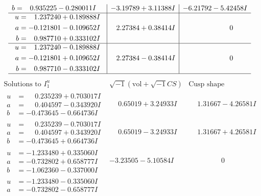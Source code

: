 \documentclass[1p]{elsarticle_modified}
\theoremstyle{definition}
\newcommand{\I}{\sqrt{-1}}
\begin{document}
$$\begin{array}{c|c|c}
\begin{aligned}
b &= \phantom{-}0.935225 - 0.280011 I\end{aligned}
 & -3.19789 + 3.11388 I & -6.21792 - 5.42458 I \\ \hline\begin{aligned}
u &= \phantom{-}1.237240 + 0.189888 I \\
a &= -0.121801 - 0.109652 I \\
b &= \phantom{-}0.987710 + 0.333102 I\end{aligned}
 & \phantom{-}2.27384 + 0.38414 I & \phantom{-0.000000 } 0 \\ \hline\begin{aligned}
u &= \phantom{-}1.237240 - 0.189888 I \\
a &= -0.121801 + 0.109652 I \\
b &= \phantom{-}0.987710 - 0.333102 I\end{aligned}
 & \phantom{-}2.27384 - 0.38414 I & \phantom{-0.000000 } 0\\
 \hline 
 \end{array}$$\newpage$$\begin{array}{c|c|c}  
\text{Solutions to }I^u_{1}& \I (\text{vol} + \sqrt{-1}CS) & \text{Cusp shape}\\
 \hline 
\begin{aligned}
u &= \phantom{-}0.235239 + 0.703017 I \\
a &= \phantom{-}0.404597 - 0.343920 I \\
b &= -0.473645 - 0.664736 I\end{aligned}
 & \phantom{-}0.65019 + 3.24933 I & \phantom{-}1.31667 - 4.26581 I \\ \hline\begin{aligned}
u &= \phantom{-}0.235239 - 0.703017 I \\
a &= \phantom{-}0.404597 + 0.343920 I \\
b &= -0.473645 + 0.664736 I\end{aligned}
 & \phantom{-}0.65019 - 3.24933 I & \phantom{-}1.31667 + 4.26581 I \\ \hline\begin{aligned}
u &= -1.233480 + 0.335060 I \\
a &= -0.732802 + 0.658777 I \\
b &= -1.062360 - 0.337000 I\end{aligned}
 & -3.23505 - 5.10584 I & \phantom{-0.000000 } 0 \\ \hline\begin{aligned}
u &= -1.233480 - 0.335060 I \\
a &= -0.732802 - 0.658777 I \\

\end{aligned}
\end{array}$$
\end{document}
